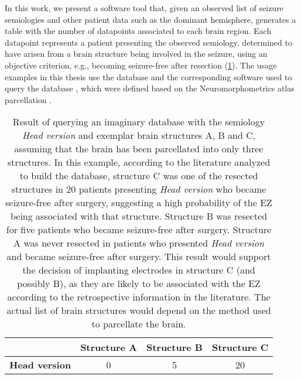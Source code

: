 In this work, we present a software tool that, given an observed list of seizure semiologies and other patient data such as the dominant hemisphere, generates a table with the number of datapoints associated to each brain region.
Each datapoint represents a patient presenting the observed semiology, determined to have arisen from a brain structure being involved in the seizure, using an objective criterion, e.g., becoming seizure-free after resection (\cref{tab:single_semiology}).
The usage examples in this thesis use the \svtdatabase database and the corresponding software used to query the database \cite{alim-marvasti_probabilistic_2021,alim-marvasti_mapping_2021}, which were defined based on the Neuromorphometrics atlas parcellation%
.

\begin{table}
  \setlength{\tabcolsep}{3pt}
  \centering
  \caption[Result of querying an imaginary database with one semiology]{
    Result of querying an imaginary database with the semiology \textit{Head version} and exemplar brain structures A, B and C, assuming that the brain has been parcellated into only three structures.
    In this example, according to the literature analyzed to build the database, structure C was one of the resected structures in 20 patients presenting \textit{Head version} who became seizure-free after surgery, suggesting a high probability of the \ac{EZ} being associated with that structure.
    Structure B was resected for five patients who became seizure-free after surgery.
    Structure A was never resected in patients who presented \textit{Head version} and became seizure-free after surgery.
    This result would support the decision of implanting electrodes in structure C (and possibly B), as they are likely to be associated with the \ac{EZ} according to the retrospective information in the literature.
    The actual list of brain structures would depend on the method used to parcellate the brain.
  }
  \label{tab:single_semiology}
  \begin{tabular}{l*3c}
    \toprule
                          & \textbf{Structure A} & \textbf{Structure B} & \textbf{Structure C} \\
    \midrule
    \textbf{Head version} &                    0 &                    5 &                   20 \\
  \end{tabular}
\end{table}

